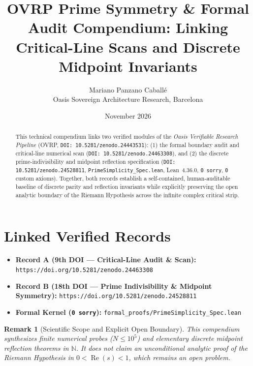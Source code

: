 \documentclass[11pt,a4paper]{article}
\title{OVRP Prime Symmetry \& Formal Audit Compendium: Linking Critical-Line Scans and Discrete Midpoint Invariants}
\author{Mariano Panzano Caball\'e \\ \small Oasis Sovereign Architecture Research, Barcelona}
\date{November 2026}
\newtheorem{remark}{Remark}
\begin{document}
\maketitle

\begin{abstract}
This technical compendium links two verified modules of the \emph{Oasis Verifiable Research Pipeline} (OVRP, \texttt{DOI: 10.5281/zenodo.24443531}): (1) the formal boundary audit and critical-line numerical scan (\texttt{DOI: 10.5281/zenodo.24463308}), and (2) the discrete prime-indivisibility and midpoint reflection specification (\texttt{DOI: 10.5281/zenodo.24528811}, \texttt{PrimeSimplicity\_Spec.lean}, Lean~4.36.0, \texttt{0 sorry}, \texttt{0} custom axioms). Together, both records establish a self-contained, human-auditable baseline of discrete parity and reflection invariants while explicitly preserving the open analytic boundary of the Riemann Hypothesis across the infinite complex critical strip.
\end{abstract}

\section{Linked Verified Records}
\begin{itemize}
  \item \textbf{Record A (9th DOI — Critical-Line Audit \& Scan):} \texttt{https://doi.org/10.5281/zenodo.24463308}
  \item \textbf{Record B (18th DOI — Prime Indivisibility \& Midpoint Symmetry):} \texttt{https://doi.org/10.5281/zenodo.24528811}
  \item \textbf{Formal Kernel (\texttt{0 sorry}):} \texttt{formal\_proofs/PrimeSimplicity\_Spec.lean}
\end{itemize}

\begin{remark}[Scientific Scope and Explicit Open Boundary]
This compendium synthesizes finite numerical probes ($N \le 10^5$) and elementary discrete midpoint reflection theorems in $\mathbb{N}$. It does not claim an unconditional analytic proof of the Riemann Hypothesis in $0 < \operatorname{Re}(s) < 1$, which remains an open problem.
\end{remark}
\end{document}
